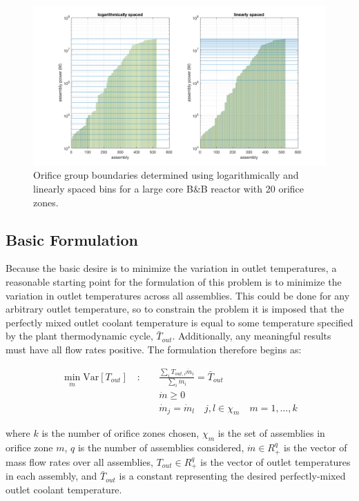 \documentclass[11pt, oneside]{article}   	%
\newcommand{\Var}{\mathrm{Var}}
\begin{document}
\begin{figure}[h!]
\includegraphics[width=18cm]{binning}
\centering
\caption{Orifice group boundaries determined using logarithmically and linearly spaced bins for a large core B\&B reactor with 20 orifice zones.}
\label{fig:binning}
\end{figure}

\subsection{Basic Formulation}

Because the basic desire is to minimize the variation in outlet temperatures, a reasonable starting point for the formulation of this problem is to minimize the variation in outlet temperatures across all assemblies.
This could be done for any arbitrary outlet temperature, so to constrain the problem it is imposed that the perfectly mixed outlet coolant temperature is equal to some temperature specified by the plant thermodynamic cycle, $\bar{T}_{out}$.
Additionally, any meaningful results must have all flow rates positive.
The formulation therefore begins as:

\begin{align}
\min_{\dot{m}} \Var [T_{out}] \quad : \quad & \frac{\sum_i T_{out,i} \dot{m}_i}{\sum_i \dot{m}_i} = \bar{T}_{out} \\
& \dot{m} \geq 0 \nonumber \\
& \dot{m}_j = \dot{m}_l \quad j,l \in \chi_m \quad m = 1, \dots, k \nonumber
\end{align}

where $k$ is the number of orifice zones chosen, $\chi_m$ is the set of assemblies in orifice zone $m$, $q$ is the number of assemblies considered, $\dot{m} \in R^q_+$ is the vector of mass flow rates over all assemblies, $T_{out} \in R^q_+$ is the vector of outlet temperatures in each assembly, and $\bar{T}_{out}$ is a constant representing the desired perfectly-mixed outlet coolant temperature.
\end{document}
